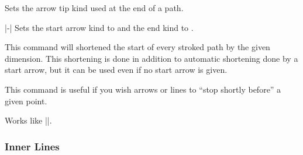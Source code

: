 \begin{command}{\pgfsetarrowsend{}}
  Sets the arrow tip kind used at the end of a path.
\begin{codeexample}[]
\begin{pgfpicture}
  \pgfpathmoveto{\pgfpointorigin}
  \pgfpathlineto{\pgfpoint{1cm}{0cm}}
\end{pgfpicture}
\end{codeexample}
\end{command}

\begin{command}{|-|}
  Sets the start arrow kind to  and the end kind to
  .
\begin{codeexample}[]
\begin{pgfpicture}
  \pgfpathmoveto{\pgfpointorigin}
  \pgfpathlineto{\pgfpoint{1cm}{0cm}}
\end{pgfpicture}
\end{codeexample}
\end{command}

\begin{command}{\pgfsetshortenstart{}}
  This command will shortened the start of every stroked path by the
  given dimension. This shortening is done in addition to automatic
  shortening done by a start arrow, but it can be used even if no
  start arrow is given.

  This command is useful if you wish arrows or lines to ``stop shortly
  before'' a given point.
\begin{codeexample}[]
\begin{pgfpicture}
  \pgfpathcircle{\pgfpointorigin}{5mm}
  \pgfsetshortenstart{4pt}
  \pgfpathmoveto{\pgfpoint{5mm}{0cm}} %
  \pgfpathlineto{\pgfpoint{2cm}{0cm}}
\end{pgfpicture}
\end{codeexample}
\end{command}

\begin{command}{\pgfsetshortenend{}}
  Works like |\pgfsetshortenstart|.
\end{command}


\subsubsection{Inner Lines}

